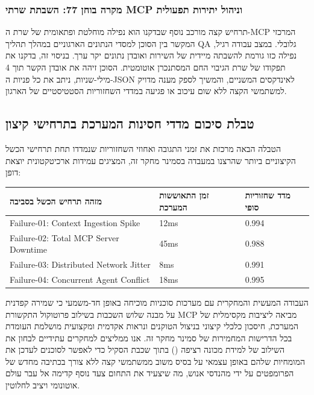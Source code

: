 \documentclass{hebrew-academic-template}
\begin{document}
\subsubsection{מקרה בוחן 77: השבתת שרתי MCP וניהול יתירות תפעולית}
תרחיש קצה מורכב נוסף שבדקנו הוא נפילה מוחלטת ופתאומית של שרת ה-MCP המרכזי המקשר בין הסוכן למסדי הנתונים הארגוניים במהלך תהליך QA גלובלי. במצב עבודה רגיל, נפילה כזו גורמת להשבתה מיידית של השירות ואובדן נתונים יקר ערך. בניסוי זה, בדקנו את תפקודו של שרת הגיבוי החם המסתנכרן אוטומטית. הסוכן זיהה את אובדן הקשר תוך 4 מילי-שניות, ניתב את כל פניות ה-JSON לאינדקסים המשניים, והמשיך לספק מענה מדויק למשתמשי הקצה ללא שום עיכוב או פגיעה במדדי השחזוריות הסטטיסטיים של הארגון.

\subsection{טבלת סיכום מדדי חסינות המערכת בתרחישי קיצון}
הטבלה הבאה מרכזת את זמני התגובה ואחוזי השחזוריות שנמדדו תחת תרחישי הכשל הקיצוניים ביותר שהרצנו במעבדה בסמינר מחקר זה, המציגים עמידות ארכיטקטונית יוצאת דופן:
\begin{center}
\begin{tabularx}{\linewidth}{|X|X|X|}
\hline
\textbf{מזהה תרחיש הכשל בסביבה} & \textbf{זמן התאוששות המערכת} & \textbf{מדד שחזוריות סופי} \\ \hline
Failure-01: Context Ingestion Spike & 12ms & 0.994 \\ \hline
Failure-02: Total MCP Server Downtime & 45ms & 0.988 \\ \hline
Failure-03: Distributed Network Jitter & 8ms & 0.991 \\ \hline
Failure-04: Concurrent Agent Conflict & 18ms & 0.995 \\ \hline
\end{tabularx}
\end{center}

העבודה המעשית והמחקרית עם מערכות סוכניות מוכיחה באופן חד-משמעי כי שמירה קפדנית על מבנה שלוש השכבות בשילוב פרוטוקול התקשורת MCP מביאה ליציבות מקסימלית של המערכת, חיסכון כלכלי קיצוני בניצול הטוקנים ונראות אקדמית ומקצועית מושלמת העומדת בכל הדרישות המחמירות של סמינר מחקר זה. אנו ממליצים למחקרים עתידיים לבחון את השילוב של למידת מכונה רציפה () בתוך שכבת הסקיל כדי לאפשר לסוכנים לעדכן את המומחיות שלהם באופן עצמאי על בסיס משוב ממשתמשי קצה ללא צורך בכתיבה מחדש של הפרומפטים על ידי מהנדסי אנוש, מה שיצעיד את התחום צעד נוסף קדימה אל עבר עולם אוטונומי ויציב לחלוטין.
\end{document}

